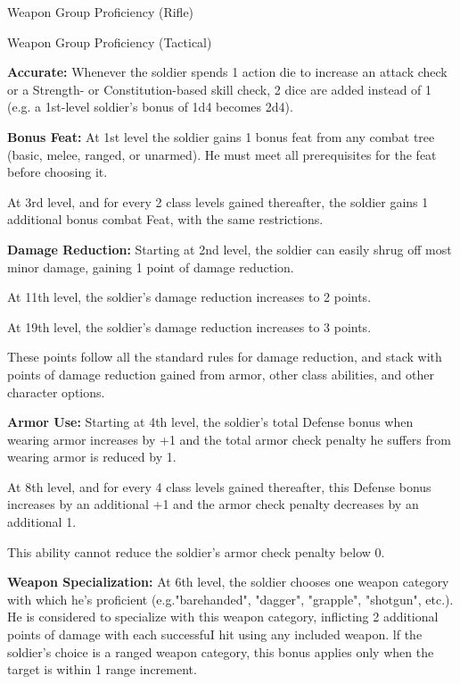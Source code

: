 Weapon Group Proficiency (Rifle)

Weapon Group Proficiency (Tactical)

\textbf{Accurate:} Whenever the soldier spends 1 action die to increase an attack check or a Strength- or Constitution-based skill check, 2 dice are added instead of 1 (e.g. a 1st-level soldier's bonus of 1d4 becomes 2d4).

\vspace*{5pt}

\textbf{Bonus Feat:} At 1st level the soldier gains 1 bonus feat from any combat tree (basic, melee, ranged, or unarmed). He must meet all prerequisites for the feat before choosing it.

At 3rd level, and for every 2 class levels gained thereafter, the soldier gains 1 additional bonus combat Feat, with the same restrictions.

\textbf{Damage Reduction:} Starting at 2nd level, the soldier can easily shrug off most minor damage, gaining 1 point of damage reduction.

At 11th level, the soldier's damage reduction increases to 2 points.

At 19th level, the soldier's damage reduction increases to 3 points.

These points follow all the standard rules for damage reduction, and stack with points of damage reduction gained from armor, other class abilities, and other character options.

\textbf{Armor Use:} Starting at 4th level, the soldier's total Defense bonus when wearing armor increases by +1 and the total armor check penalty he suffers from wearing armor is reduced by 1.

At 8th level, and for every 4 class levels gained thereafter, this Defense bonus increases by an additional +1 and the armor check penalty decreases by an additional 1.

This ability cannot reduce the soldier's armor check penalty below 0.

\textbf{Weapon Specialization:} At 6th level, the soldier chooses one weapon category with which he's proficient (e.g."barehanded", "dagger", "grapple", "shotgun", etc.). He is considered to specialize with this weapon category, inflicting 2 additional points of damage with each successfuI hit using any included weapon. lf the soldier's choice is a ranged weapon category, this bonus applies only when the target is within 1 range increment.

